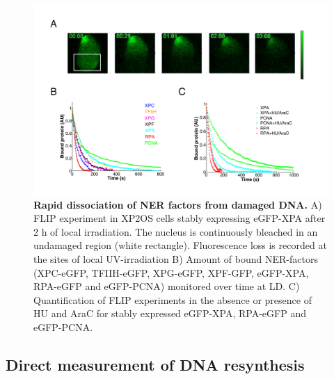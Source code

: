   \begin{figure}[htbp]
  	\begin{center}
  		\includegraphics[width=1\textwidth]{Abbildungen/figure2_2_2.pdf}
  		\caption{\textbf{Rapid dissociation of NER factors from damaged DNA.} A) FLIP experiment in XP2OS cells stably expressing eGFP-XPA after 2 h of local irradiation. The nucleus is continuously bleached in an undamaged region (white rectangle). Fluorescence loss is recorded at the sites of local UV-irradiation B) Amount of bound NER-factors (XPC-eGFP, TFIIH-eGFP, XPG-eGFP, XPF-GFP, eGFP-XPA, RPA-eGFP and eGFP-PCNA) monitored over time at LD. C) Quantification of FLIP experiments in the absence or presence of HU and AraC for stably expressed eGFP-XPA, RPA-eGFP and eGFP-PCNA.}
  		\label{fig:accuFlip}
  	\end{center}
  \end{figure}



\subsection{Direct measurement of DNA resynthesis}
\label{Subsec:EdUmeasurement}

